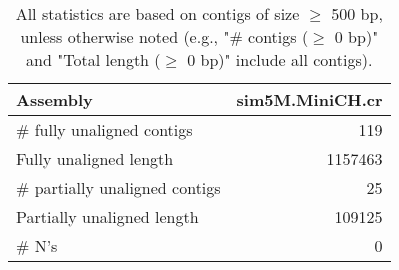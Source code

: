 \documentclass[12pt,a4paper]{article}
\begin{document}
\begin{table}[ht]
\begin{center}
\caption{All statistics are based on contigs of size $\geq$ 500 bp, unless otherwise noted (e.g., "\# contigs ($\geq$ 0 bp)" and "Total length ($\geq$ 0 bp)" include all contigs).}
\begin{tabular}{|l*{1}{|r}|}
\hline
Assembly & sim5M.MiniCH.cr \\ \hline
\# fully unaligned contigs & 119 \\ \hline
Fully unaligned length & 1157463 \\ \hline
\# partially unaligned contigs & 25 \\ \hline
Partially unaligned length & 109125 \\ \hline
\# N's & 0 \\ \hline
\end{tabular}
\end{center}
\end{table}
\end{document}
